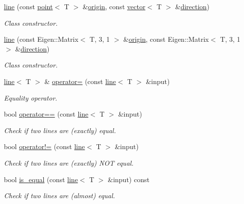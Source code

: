 \begin{DoxyCompactItemize}
\hyperlink{classddd_1_1line_a8499fa13ffea06de1705c05f742e0f5c}{line} (const \hyperlink{classddd_1_1point}{point}$<$ T $>$ \&\hyperlink{classddd_1_1line_a229e71bc976e64ac6129d14113a0d529}{origin}, const \hyperlink{classddd_1_1vector}{vector}$<$ T $>$ \&\hyperlink{classddd_1_1line_a49d6c131bbf73688280bafadfd284e8b}{direction})
\begin{DoxyCompactList}\small\item\em Class constructor. \end{DoxyCompactList}\item 
\hyperlink{classddd_1_1line_aef2bb8b4dcdf78f86c8e178ddd483eab}{line} (const Eigen\+::\+Matrix$<$ T, 3, 1 $>$ \&\hyperlink{classddd_1_1line_a229e71bc976e64ac6129d14113a0d529}{origin}, const Eigen\+::\+Matrix$<$ T, 3, 1 $>$ \&\hyperlink{classddd_1_1line_a49d6c131bbf73688280bafadfd284e8b}{direction})
\begin{DoxyCompactList}\small\item\em Class constructor. \end{DoxyCompactList}\item 
\hyperlink{classddd_1_1line}{line}$<$ T $>$ \& \hyperlink{classddd_1_1line_aaac9139569d98d11350a92cc33b960fa}{operator=} (const \hyperlink{classddd_1_1line}{line}$<$ T $>$ \&input)
\begin{DoxyCompactList}\small\item\em Equality operator. \end{DoxyCompactList}\item 
bool \hyperlink{classddd_1_1line_aa1710ad864090b61a9f67e12e9f6986b}{operator==} (const \hyperlink{classddd_1_1line}{line}$<$ T $>$ \&input)
\begin{DoxyCompactList}\small\item\em Check if two lines are (exactly) equal. \end{DoxyCompactList}\item 
bool \hyperlink{classddd_1_1line_a1ff398ce69c656f9f51fc307f0753d10}{operator!=} (const \hyperlink{classddd_1_1line}{line}$<$ T $>$ \&input)
\begin{DoxyCompactList}\small\item\em Check if two lines are (exactly) N\+OT equal. \end{DoxyCompactList}\item 
bool \hyperlink{classddd_1_1line_aecc0993bff268ebf77fb77665ad003a6}{is\+\_\+equal} (const \hyperlink{classddd_1_1line}{line}$<$ T $>$ \&input) const
\begin{DoxyCompactList}\small\item\em Check if two lines are (almost) equal. \end{DoxyCompactList}\item 

\end{DoxyCompactItemize}
